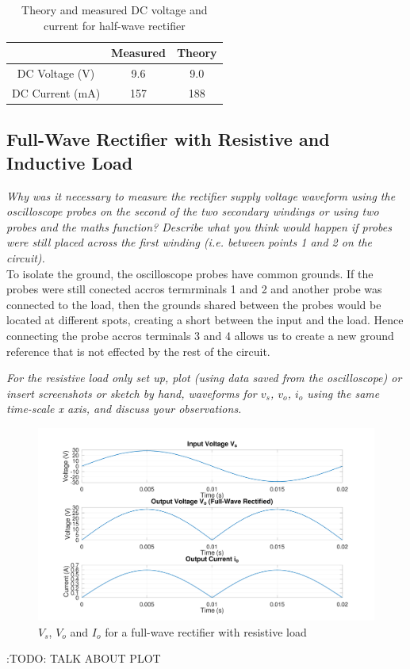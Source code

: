\documentclass[12pt,a4paper]{article}
\begin{document}
\begin{table}[H]
\caption{Theory and measured DC voltage and current for half-wave rectifier \label{tab:table1}}
\centering
\begin{tabular}{|c|c|c|}
\hline
 & Measured & Theory\\
\hline
DC Voltage (V) & 9.6 & 9.0\\
\hline
DC Current (mA) & 157 & 188\\
\hline
\end{tabular}
\end{table}

\subsection{Full-Wave Rectifier with Resistive and Inductive Load}
\textit{Why was it necessary to measure the rectifier supply voltage waveform using the oscilloscope
probes on the second of the two secondary windings or using two probes and the maths function?
Describe what you think would happen if probes were still placed across the first winding (i.e.
between points 1 and 2 on the circuit).}\\

To isolate the ground, the oscilloscope probes have common grounds. If the probes were still conected accros termrminals 1 and 2 and another probe was connected to the load, then the grounds shared between the probes would be located at different spots, creating a short between the input and the load. Hence connecting the probe accros terminals 3 and 4 allows us to create a new ground reference that is not effected by the rest of the circuit.

\textit{For the resistive load only set up, plot (using data saved from the oscilloscope) or insert screenshots
or sketch by hand, waveforms for $v_s$, $v_o$, $i_o$ using the same time-scale x axis, and discuss your
observations.}\\

\begin{figure}[H]
\centering
\includegraphics[width=.9\linewidth]{ENG306_Lab_2_Full_Wave_Rectifier.png}
\caption{\(V_s\), \(V_o\) and \(I_o\) for a full-wave rectifier with resistive load \label{fig:figure2}}
\end{figure}
:TODO: TALK ABOUT PLOT
\end{document}
